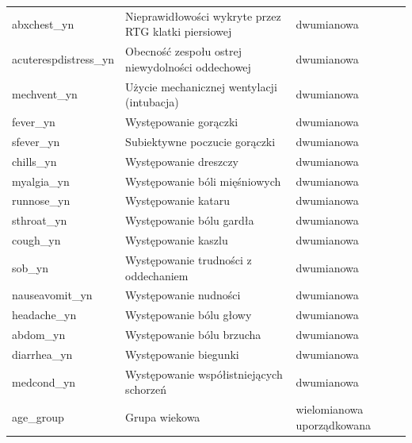 \documentclass[polish, twoside, 12pt, a4paper]{article}
\theoremstyle{definition}
\theoremstyle{plain}
\theoremstyle{remark}
\begin{document}
\begin{landscape}
{\begin{longtable}{lll}
abxchest\_yn              & Nieprawidłowości wykryte przez RTG klatki piersiowej & dwumianowa                    \\
acuterespdistress\_yn     & Obecność zespołu ostrej niewydolności oddechowej     & dwumianowa                    \\
mechvent\_yn              & Użycie mechanicznej wentylacji (intubacja)           & dwumianowa                    \\
fever\_yn                 & Występowanie gorączki                                & dwumianowa                    \\
sfever\_yn                & Subiektywne poczucie gorączki                        & dwumianowa                    \\
chills\_yn                & Występowanie dreszczy                                & dwumianowa                    \\
myalgia\_yn               & Występowanie bóli mięśniowych                        & dwumianowa                    \\
runnose\_yn               & Występowanie kataru                                  & dwumianowa                    \\
sthroat\_yn               & Występowanie bólu gardła                             & dwumianowa                    \\
cough\_yn                 & Występowanie kaszlu                                  & dwumianowa                    \\
sob\_yn                   & Występowanie trudności z oddechaniem                 & dwumianowa                    \\
nauseavomit\_yn           & Występowanie nudności                                & dwumianowa                    \\
headache\_yn              & Występowanie bólu głowy                              & dwumianowa                    \\
abdom\_yn                 & Występowanie bólu brzucha                            & dwumianowa                    \\
diarrhea\_yn              & Występowanie biegunki                                & dwumianowa                    \\
medcond\_yn               & Występowanie współistniejących schorzeń              & dwumianowa                    \\
age\_group                & Grupa wiekowa                                        & wielomianowa uporządkowana    \\

\end{longtable}}
\end{landscape}
\end{document}
